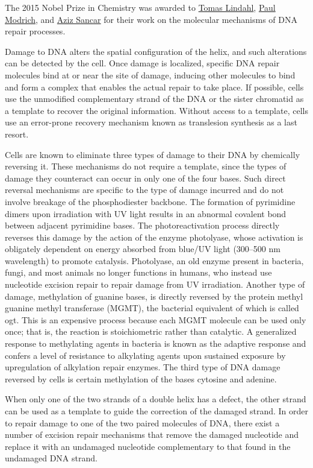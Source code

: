 The 2015 Nobel Prize in Chemistry was awarded to \href{https://en.wikipedia.org/wiki/Tomas_Lindahl}{Tomas Lindahl}, \href{https://en.wikipedia.org/wiki/Paul_L._Modrich}{Paul Modrich}, and \href{https://en.wikipedia.org/wiki/Aziz_Sancar}{Aziz Sancar} for their work on the molecular mechanisms of DNA repair processes.

Damage to DNA alters the spatial configuration of the helix, and such alterations can be detected by the cell. Once damage is localized, specific DNA repair molecules bind at or near the site of damage, inducing other molecules to bind and form a complex that enables the actual repair to take place. If possible, cells use the unmodified complementary strand of the DNA or the sister chromatid as a template to recover the original information. Without access to a template, cells use an error-prone recovery mechanism known as translesion synthesis as a last resort.

Cells are known to eliminate three types of damage to their DNA by chemically reversing it. These mechanisms do not require a template, since the types of damage they counteract can occur in only one of the four bases. Such direct reversal mechanisms are specific to the type of damage incurred and do not involve breakage of the phosphodiester backbone. The formation of pyrimidine dimers upon irradiation with UV light results in an abnormal covalent bond between adjacent pyrimidine bases. The photoreactivation process directly reverses this damage by the action of the enzyme photolyase, whose activation is obligately dependent on energy absorbed from blue/UV light (300--500 nm wavelength) to promote catalysis. Photolyase, an old enzyme present in bacteria, fungi, and most animals no longer functions in humans, who instead use nucleotide excision repair to repair damage from UV irradiation. Another type of damage, methylation of guanine bases, is directly reversed by the protein methyl guanine methyl transferase (MGMT), the bacterial equivalent of which is called ogt. This is an expensive process because each MGMT molecule can be used only once; that is, the reaction is stoichiometric rather than catalytic. A generalized response to methylating agents in bacteria is known as the adaptive response and confers a level of resistance to alkylating agents upon sustained exposure by upregulation of alkylation repair enzymes. The third type of DNA damage reversed by cells is certain methylation of the bases cytosine and adenine.

When only one of the two strands of a double helix has a defect, the other strand can be used as a template to guide the correction of the damaged strand. In order to repair damage to one of the two paired molecules of DNA, there exist a number of excision repair mechanisms that remove the damaged nucleotide and replace it with an undamaged nucleotide complementary to that found in the undamaged DNA strand.

